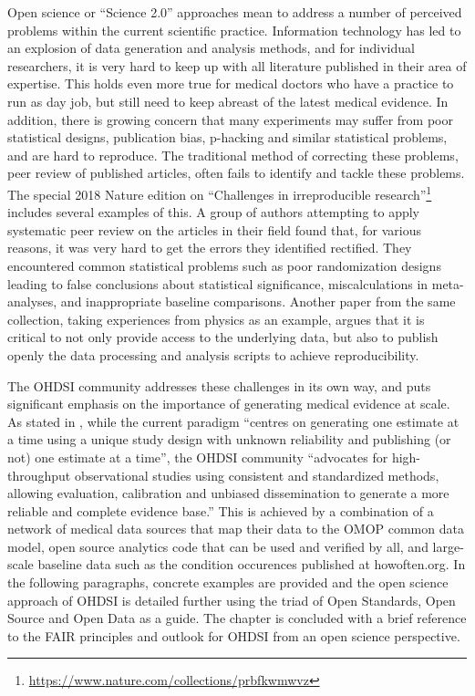 \documentclass[11pt]{book}
\let\rmarkdownfootnote\footnote%
\def\footnote{\protect\rmarkdownfootnote}
\theoremstyle{definition}
\theoremstyle{definition}
\theoremstyle{definition}
\theoremstyle{remark}
\begin{document}
Open science or ``Science 2.0'' \citep{wiki:Science_2.0} approaches mean to address a number of perceived problems within the current scientific practice. Information technology has led to an explosion of data generation and analysis methods, and for individual researchers, it is very hard to keep up with all literature published in their area of expertise. This holds even more true for medical doctors who have a practice to run as day job, but still need to keep abreast of the latest medical evidence. In addition, there is growing concern that many experiments may suffer from poor statistical designs, publication bias, p-hacking and similar statistical problems, and are hard to reproduce. The traditional method of correcting these problems, peer review of published articles, often fails to identify and tackle these problems. The special 2018 Nature edition on ``Challenges in irreproducible research''\footnote{\url{https://www.nature.com/collections/prbfkwmwvz}} includes several examples of this. A group of authors attempting to apply systematic peer review on the articles in their field found that, for various reasons, it was very hard to get the errors they identified rectified. They encountered common statistical problems such as poor randomization designs leading to false conclusions about statistical significance, miscalculations in meta-analyses, and inappropriate baseline comparisons. \citep{allison_2016} Another paper from the same collection, taking experiences from physics as an example, argues that it is critical to not only provide access to the underlying data, but also to publish openly the data processing and analysis scripts to achieve reproducibility.

The OHDSI community addresses these challenges in its own way, and puts significant emphasis on the importance of generating medical evidence at scale. As stated in \citet{schuemie_2018b}, while the current paradigm ``centres on generating one estimate at a time using a unique study design with unknown reliability and publishing (or not) one estimate at a time'', the OHDSI community ``advocates for high-throughput observational studies
using consistent and standardized methods, allowing evaluation, calibration and unbiased dissemination to generate a more reliable and complete evidence base.'' This is achieved by a combination of a network of medical data sources that map their data to the OMOP common data model, open source analytics code that can be used and verified by all, and large-scale baseline data such as the condition occurences published at howoften.org. In the following paragraphs, concrete examples are provided and the open science approach of OHDSI is detailed further using the triad of Open Standards, Open Source and Open Data as a guide. The chapter is concluded with a brief reference to the FAIR principles and outlook for OHDSI from an open science perspective.
\end{document}
